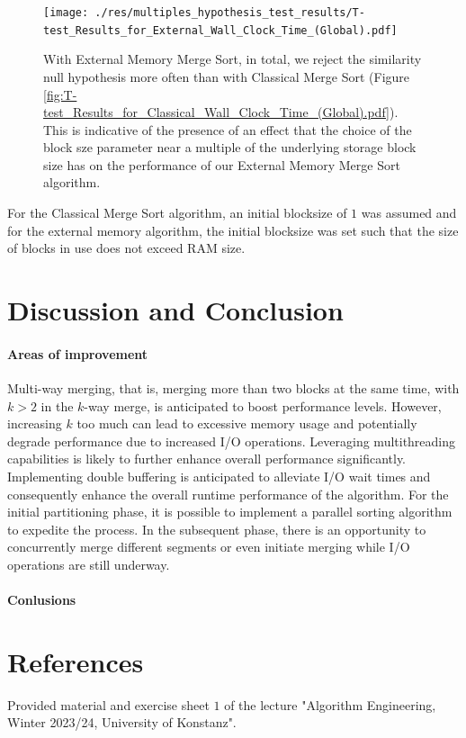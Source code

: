 \documentclass[twocolumn]{article}
\begin{document}
\begin{figure}[htb]
    \begin{minipage}{0.475 \textwidth}
        \centering
        \texttt{[image: ./res/multiples\_hypothesis\_test\_results/T-test\_Results\_for\_External\_Wall\_Clock\_Time\_(Global).pdf]}
        \caption{With External Memory Merge Sort, in total, we reject the similarity null hypothesis more often than with Classical Merge Sort (Figure \ref{fig:T-test_Results_for_Classical_Wall_Clock_Time_(Global).pdf}). This is indicative of the presence of an effect that the choice of the block sze parameter
            near a multiple of the underlying storage block size has on the performance of our External Memory Merge Sort algorithm.}
        \label{fig:T-test_Results_for_External_Wall_Clock_Time_(Global).pdf}
    \end{minipage}
\end{figure}

\begin{center}
\end{center}

For the Classical Merge Sort algorithm, an initial blocksize of \( 1 \) was assumed and for the external memory algorithm, the initial blocksize was set such that the size of blocks in use does not exceed RAM size.


\section{Discussion and Conclusion}

\paragraph{Areas of improvement}
Multi-way merging, that is, merging more than two blocks at the same time, with \( k > 2 \)  in the \( k \)-way merge, is anticipated to boost performance levels.
However, increasing \(k\) too much can lead to excessive memory usage and potentially degrade performance due to increased I/O operations.
Leveraging multithreading capabilities is likely to further enhance overall performance significantly.
Implementing double buffering is anticipated to alleviate I/O wait times and consequently enhance the overall runtime performance of the algorithm.
For the initial partitioning phase, it is possible to implement a parallel sorting algorithm to expedite the process.
In the subsequent phase, there is an opportunity to concurrently merge different segments or even initiate merging while I/O operations are still underway.

\paragraph{Conlusions}


\section{References}
Provided material and exercise sheet \( 1\) of the lecture "Algorithm Engineering, Winter 2023/24, University of Konstanz".
\end{document}
